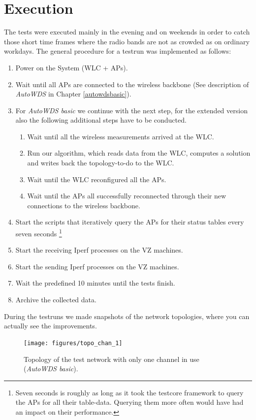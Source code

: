   \section{Execution}
    The tests were executed mainly in the evening and on weekends in order to catch those short time frames where the radio bands are not as crowded as on ordinary workdays.
    The general procedure for a testrun was implemented as follows:
    \begin{enumerate}
      \item Power on the System (\ac{WLC} + APs).
      \item Wait until all APs are connected to the wireless backbone (See description of \textit{AutoWDS} in Chapter \ref{autowdsbasic}).
      \item For \textit{AutoWDS basic} we continue with the next step, for the extended version also the following additional steps have to be conducted.
	\begin{enumerate}
	 \item Wait until all the wireless measurements arrived at the \ac{WLC}.
	 \item Run our algorithm, which reads data from the \ac{WLC}, computes a solution and writes back the topology-to-do to the \ac{WLC}.
	 \item Wait until the \ac{WLC} reconfigured all the APs.
	 \item Wait until the APs all successfully reconnected through their new connections to the wireless backbone.
	\end{enumerate}
      \item Start the scripts that iteratively query the APs for their status tables every seven seconds \footnote{Seven seconds is roughly as long as it took the testcore
	framework to query the APs for all their table-data.
	Querying them more often would have had an impact on their performance.}
      \item Start the receiving Iperf processes on the VZ machines.
      \item Start the sending Iperf processes on the VZ machines.
      \item Wait the predefined 10 minutes until the tests finish.
      \item Archive the collected data.
    \end{enumerate}
    
\newpage

    During the testruns we made snapshots of the network topologies, where you can actually see the improvements.    
    \begin{figure}[h!]
      \centering
	\texttt{[image: figures/topo\_chan\_1]}
	\caption{Topology of the test network with only one channel in use (\textit{AutoWDS basic}).\protect\footnotemark }
      \label{fig:topo_chan_1}
    \end{figure}
    
